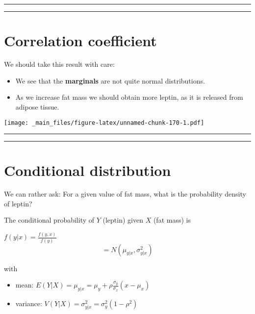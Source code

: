 \documentclass[
]{book}
\providecommand{\tightlist}{%
  \setlength{\itemsep}{0pt}\setlength{\parskip}{0pt}}
\begin{document}
\begin{center}\rule{0.5\linewidth}{0.5pt}\end{center}

\begin{center}\rule{0.5\linewidth}{0.5pt}\end{center}

\hypertarget{correlation-coefficient-2}{%
\section{Correlation coefficient}\label{correlation-coefficient-2}}

We should take this result with care:

\begin{itemize}
\tightlist
\item
  We see that the \textbf{marginals} are not quite normal distributions.
\item
  As we increase fat mass we should obtain more leptin, as it is released from adipose tissue.
\end{itemize}

\texttt{[image: \_main\_files/figure-latex/unnamed-chunk-170-1.pdf]}

\begin{center}\rule{0.5\linewidth}{0.5pt}\end{center}

\begin{center}\rule{0.5\linewidth}{0.5pt}\end{center}

\hypertarget{conditional-distribution}{%
\section{Conditional distribution}\label{conditional-distribution}}

We can rather ask: For a given value of fat mass, what is the probability density of leptin?

The conditional probability of \(Y\) (leptin) given \(X\) (fat mass) is

\(f(y|x)=\frac{f(y,x)}{f(y)}\)
\[=N(\mu_{y|x}, \sigma^2_{y|x})\]

with

\begin{itemize}
\item
  mean: \(E(Y|X)=\mu_{y|x}=\mu_y+\rho\frac{\sigma_y}{\sigma_x}(x-\mu_x)\)
\item
  variance: \(V(Y|X)=\sigma^2_{y|x}= \sigma_y^2(1-\rho^2)\)
\end{itemize}
\end{document}
